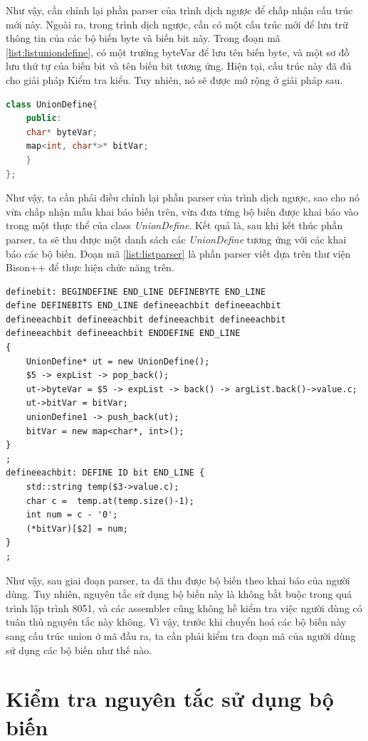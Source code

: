Như vậy, cần chỉnh lại phần parser của trình dịch ngược để chấp nhận cấu trúc mới này. Ngoài ra, trong trình dịch ngược, cần có một cấu trúc mới để lưu trữ thông tin của các bộ biến byte và biến bit này. Trong đoạn mã \ref{list:listuniondefine}, có một trường byteVar để lưu tên biến byte, và một sơ đồ lưu thứ tự của biến bit và tên biến bit tương ứng. Hiện tại, cấu trúc này đã đủ cho giải pháp Kiểm tra kiểu. Tuy nhiên, nó sẽ được mở rộng ở giải pháp sau. 
\begin{lstlisting}[caption={Cấu trúc dữ liệu để lưu trữ một bộ biến},label={list:listuniondefine},language=c++]
class UnionDefine{
	public:
	char* byteVar;
	map<int, char*>* bitVar;
	}
};
\end{lstlisting}
Như vậy, ta cần phải điều chỉnh lại phần parser của trình dịch ngược, sao cho nó vừa chấp nhận mẫu khai báo biến trên, vừa đưa từng bộ biến được khai báo vào trong một thực thể của class \textit{UnionDefine}. Kết quả là, sau khi kết thúc phần parser, ta sẽ thu được một danh sách các \textit{UnionDefine} tương ứng với các khai báo các bộ biến. Đoạn mã \ref{list:listparser} là phần parser viết dựa trên thư viện Bison++ để thực hiện chức năng trên.\\
\begin{lstlisting}[caption={Đoạn mã parser cho phần khai báo bộ biến},label={list:listparser}]
definebit: BEGINDEFINE END_LINE DEFINEBYTE END_LINE 
define DEFINEBITS END_LINE defineeachbit defineeachbit
defineeachbit defineeachbit defineeachbit defineeachbit 
defineeachbit defineeachbit ENDDEFINE END_LINE
{
	UnionDefine* ut = new UnionDefine();
	$5 -> expList -> pop_back();
	ut->byteVar = $5 -> expList -> back() -> argList.back()->value.c;
	ut->bitVar = bitVar;
	unionDefine1 -> push_back(ut);
	bitVar = new map<char*, int>();
}
;
defineeachbit: DEFINE ID bit END_LINE {
	std::string temp($3->value.c);
	char c =  temp.at(temp.size()-1);
	int num = c - '0';
	(*bitVar)[$2] = num;
}
;
\end{lstlisting}
Như vậy, sau giai đoạn parser, ta đã thu được bộ biến theo khai báo của người dùng. Tuy nhiên, nguyên tắc sử dụng bộ biến này là không bắt buộc trong quá trình lập trình 8051, và các assembler cũng không hề kiểm tra việc người dùng có tuân thủ nguyên tắc này không. Vì vậy, trước khi chuyển hoá các bộ biến này sang cấu trúc union ở mã đầu ra, ta cần phải kiểm tra đoạn mã của người dùng sử dụng các bộ biến như thế nào.

\section{Kiểm tra nguyên tắc sử dụng bộ biến}
